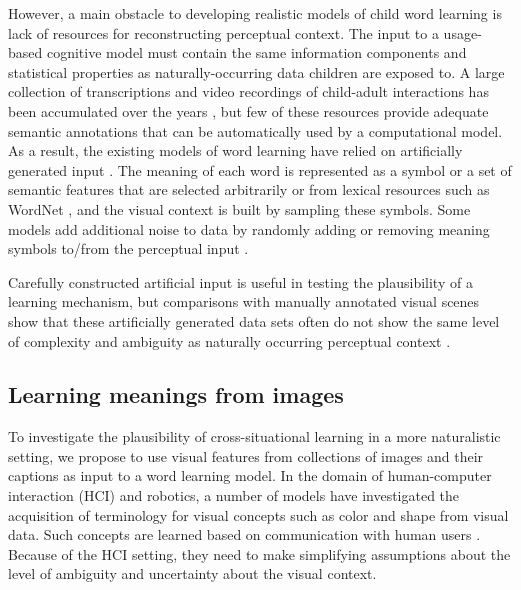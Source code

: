However, a main obstacle to developing realistic models of child word
learning is lack of resources for reconstructing perceptual
context. The input to a usage-based cognitive model must contain the
same information components and statistical properties as
naturally-occurring data children are exposed to. A large collection
of transcriptions and video recordings of child-adult interactions has
been accumulated over the years \citep{macwhinney2014childes}, but few
of these resources provide adequate semantic annotations that can be
automatically used by a computational model. As a result, the existing
models of word learning have relied on artificially generated
input \citep{siskind.96}. The meaning of each word is represented as a symbol or a set of
semantic features that are selected arbitrarily or from lexical
resources such as WordNet \citep{fellbaum1998wordnet}, and the visual
context is built by sampling these symbols. Some models add additional noise
to data by randomly adding or removing meaning symbols to/from the perceptual
input \citep{fazly.etal.10csj}.

Carefully constructed artificial input is useful in testing the
plausibility of a learning mechanism, but comparisons with manually
annotated visual scenes show that these artificially generated data
sets often do not show the same level of complexity and ambiguity as
naturally occurring perceptual context
\citep{matusevych2013automatic,beekhuizen2013word}.

\subsection{Learning meanings from images}
\label{subsec:meanings-from-images}
To investigate the plausibility of cross-situational learning in a
more naturalistic setting, we propose to use visual features from
collections of images and their captions as input to a word learning
model.
%
In the domain of human-computer interaction (HCI) and robotics, a
number of models have investigated the acquisition of terminology for
visual concepts such as color and shape from visual data. Such
concepts are learned based on communication with human users
\citep{FleischmanRoy2005,skocaj2011system}.  Because of the HCI
setting, they need to make simplifying assumptions about the level of
ambiguity and uncertainty about the visual context.

